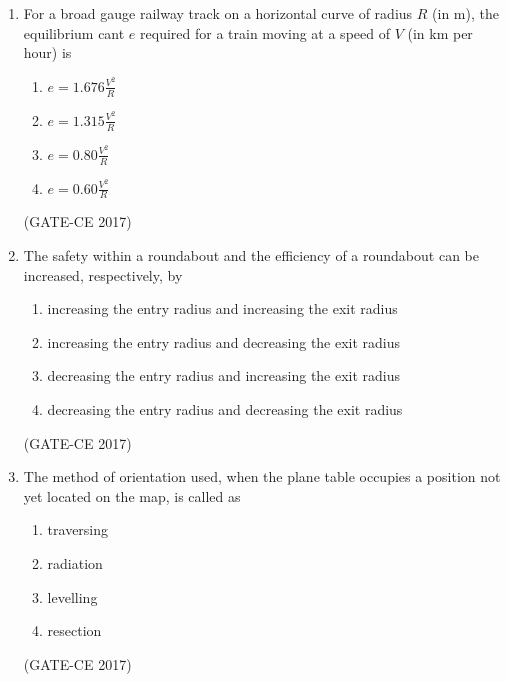 \documentclass[journal,12pt,onecolumn]{article}
\theoremstyle{remark}
\begin{document}
\begin{enumerate}
    \item For a broad gauge railway track on a horizontal curve of radius $ R $ (in m), the equilibrium cant $ e $ required for a train moving at a speed of $ V $ (in km per hour) is
    \begin{multicols}{2}
    \begin{enumerate}
        \item $ e = 1.676 \frac{V^2}{R} $  
        \item $ e = 1.315 \frac{V^2}{R} $  
        \item $ e = 0.80 \frac{V^2}{R} $  
        \item $ e = 0.60 \frac{V^2}{R} $  
    \end{enumerate}
    \end{multicols}
    \hfill (GATE-CE 2017)

    \item The safety within a roundabout and the efficiency of a roundabout can be increased, respectively, by
    \begin{enumerate}
        \item increasing the entry radius and increasing the exit radius 
        \item increasing the entry radius and decreasing the exit radius 
        \item decreasing the entry radius and increasing the exit radius 
        \item decreasing the entry radius and decreasing the exit radius
        
    \end{enumerate}
    \hfill (GATE-CE 2017)

    \item The method of orientation used, when the plane table occupies a position not yet located on the map, is called as
    \begin{multicols}{4}
    \begin{enumerate}
        \item traversing  
        \item radiation  
        \item levelling  
        \item resection  
    \end{enumerate}
    \end{multicols}
    \hfill (GATE-CE 2017)


\end{enumerate}
\end{document}
